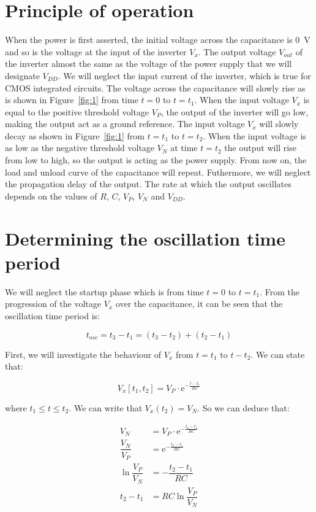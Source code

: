 \documentclass[a4paper,12pt]{article}
\begin{document}
\section{Principle of operation}
When the power is first asserted, the initial voltage across the capacitance is \qty{0}{\volt} and so is the voltage at the input of the inverter $V_x$. The output voltage $V_{out}$ of the inverter almost the same as the voltage of the power supply that we will designate $V_{DD}$. We will neglect the input current of the inverter, which is true for CMOS integrated circuits. 
The voltage across the capacitance will slowly rise as is shown in Figure~\ref{fig:1} from time $t=0$ to $t=t_1$. When the input voltage $V_x$ is equal to the positive threshold voltage $V_P$, the output of the inverter will go low, making the output act as a ground reference. The input voltage $V_x$ will slowly decay as shown in Figure~\ref{fig:1} from $t=t_1$ to $t=t_2$. When the input voltage is as low as the negative threshold voltage $V_N$ at time $t=t_2$ the output will rise from low to high, so the output is acting as the power supply. From now on, the load and unload curve of the capacitance will repeat. Futhermore, we will neglect the propagation delay of the output. The rate at which the output oscillates depends on the values of $R$, $C$, $V_P$, $V_N$ and $V_{DD}$.

\section{Determining the oscillation time period}
We will neglect the startup phase which is from time $t=0$ to $t=t_1$.
From the progression of the voltage $V_x$ over the capacitance, it can be seen that the oscillation time period is:

\begin{equation}
t_{osc} = t_3-t_1 = (t_3-t_2) + (t_2-t_1)
\end{equation}

First, we will investigate the behaviour of $V_x$ from $t=t_1$ to $t-t_2$. We can state that:

\begin{equation}
V_x[t_1,t_2] = V_P\cdot\mathrm{e}^{-\frac{t-t_1}{RC}}
\end{equation}

where $t_1 \leq t \leq  t_2$. We can write that $V_x(t_2) = V_N$. So we can deduce that:

\begin{equation}
\begin{split}
V_N &= V_P\cdot \mathrm{e}^{-\frac{t_2-t_1}{RC}}\\
\dfrac{V_N}{V_P} &= \mathrm{e}^{-\frac{t_2-t_1}{RC}}\\
\ln \dfrac{V_P}{V_N} &= -\dfrac{t_2-t_1}{RC}\\
t_2-t_1 &= RC\ln\dfrac{V_P}{V_N}
\end{split}
\end{equation}
\end{document}
